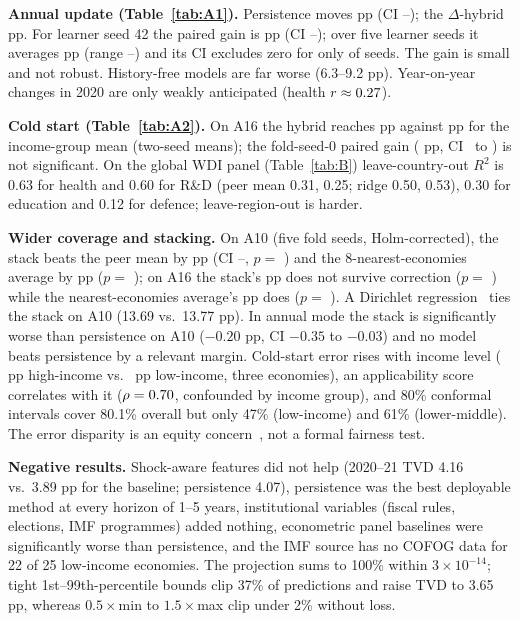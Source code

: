 \documentclass[conference]{IEEEtran}
\DeclareRobustCommand*{\_}{\textunderscore\hskip0pt\relax}
\begin{document}
\textbf{Annual update (Table~\ref{tab:A1}).} Persistence moves \ResTVDPersist{} pp (CI \ResTVDPersistLo--\ResTVDPersistHi); the $\Delta$-hybrid \ResTVDHyb{} pp. For learner seed 42 the paired gain is \ResPairedGain{} pp (CI \ResPairedLo--\ResPairedHi); over five learner seeds it averages \AnnSeedMeanGain{} pp (range \AnnSeedMinGain--\AnnSeedMaxGain) and its CI excludes zero for only \AnnSeedNExcl{} of \AnnSeedN{} seeds. The gain is small and not robust. History-free models are far worse (6.3--9.2 pp). Year-on-year changes in 2020 are only weakly anticipated (health $r\approx0.27$).


\textbf{Cold start (Table~\ref{tab:A2}).} On A16 the hybrid reaches \ResColdHyb{} pp against \ResColdPeer{} pp for the income-group mean (two-seed means); the fold-seed-0 paired gain (\ResColdGain{} pp, CI \ResColdGainLo\ to \ResColdGainHi) is not significant. On the global WDI panel (Table~\ref{tab:B}) leave-country-out $R^2$ is 0.63 for health and 0.60 for R\&D (peer mean 0.31, 0.25; ridge 0.50, 0.53), 0.30 for education and 0.12 for defence; leave-region-out is harder.



\figLime

\textbf{Wider coverage and stacking.} On A10 (five fold seeds, Holm-corrected), the stack beats the peer mean by \FSStackTenGain{} pp (CI \FSStackTenLo--\FSStackTenHi, $p=$ \FSStackTenHolm) and the 8-nearest-economies average by \FSKnnTenGain{} pp ($p=$ \FSKnnTenHolm); on A16 the stack's \FSStackSixteenGain{} pp does not survive correction ($p=$ \FSStackSixteenHolm) while the nearest-economies average's \FSKnnSixteenGain{} pp does ($p=$ \FSKnnSixteenHolm). A Dirichlet regression~\cite{ferrari2004} ties the stack on A10 (13.69 vs.\ 13.77 pp). In annual mode the stack is significantly worse than persistence on A10 ($-0.20$ pp, CI $-0.35$ to $-0.03$) and no model beats persistence by a relevant margin. Cold-start error rises with income level (\ErrHigh{} pp high-income vs.\ \ErrLow{} pp low-income, three economies), an applicability score correlates with it ($\rho=0.70$, confounded by income group), and 80\% conformal intervals cover 80.1\% overall but only 47\% (low-income) and 61\% (lower-middle). The error disparity is an equity concern~\cite{mehrabi2021,obermeyer2019}, not a formal fairness test.

\textbf{Negative results.} Shock-aware features did not help (2020--21 TVD 4.16 vs.\ 3.89 pp for the baseline; persistence 4.07), persistence was the best deployable method at every horizon of 1--5 years, institutional variables (fiscal rules, elections, IMF programmes) added nothing, econometric panel baselines were significantly worse than persistence, and the IMF source has no COFOG data for 22 of 25 low-income economies. The projection sums to 100\% within $3\times10^{-14}$; tight 1st--99th-percentile bounds clip 37\% of predictions and raise TVD to 3.65 pp, whereas $0.5\times$min to $1.5\times$max clip under 2\% without loss.
\end{document}
